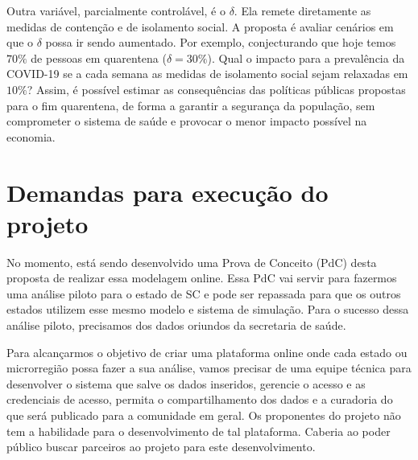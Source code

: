 \documentclass[12pt,a4papper]{article}
\begin{document}
Outra variável, parcialmente controlável, é o $\delta$. Ela remete diretamente as medidas de contenção e de isolamento social. A proposta é avaliar cenários em que o $\delta$ possa ir sendo aumentado. Por exemplo, conjecturando que hoje temos $70\%$ de pessoas em quarentena ($\delta=30\%$). Qual o impacto para a prevalência da COVID-19 se a cada semana as medidas de isolamento social sejam relaxadas em $10\%$? Assim, é possível estimar as consequências das políticas públicas propostas para o fim quarentena, de forma a garantir a segurança da população, sem comprometer o sistema de saúde e provocar o menor impacto possível na economia. 


\section{Demandas para execução do projeto}

No momento, está sendo desenvolvido uma Prova de Conceito (PdC) desta proposta de realizar essa modelagem online. Essa PdC vai servir para fazermos uma análise piloto para o estado de SC e pode ser repassada para que os outros estados utilizem esse mesmo modelo e sistema de simulação. Para o sucesso dessa análise piloto, precisamos dos dados oriundos da secretaria de saúde. 

Para alcançarmos o objetivo de criar uma plataforma online onde cada estado ou microrregião possa fazer a sua análise, vamos precisar de uma equipe técnica para desenvolver o sistema que salve os dados inseridos, gerencie o acesso e as credenciais de acesso, permita o compartilhamento dos dados e a curadoria do que será publicado para a comunidade em geral. Os proponentes do projeto não tem a habilidade para o desenvolvimento de tal plataforma. Caberia ao poder público buscar parceiros ao projeto para este desenvolvimento.



	
	
	


\end{document}
